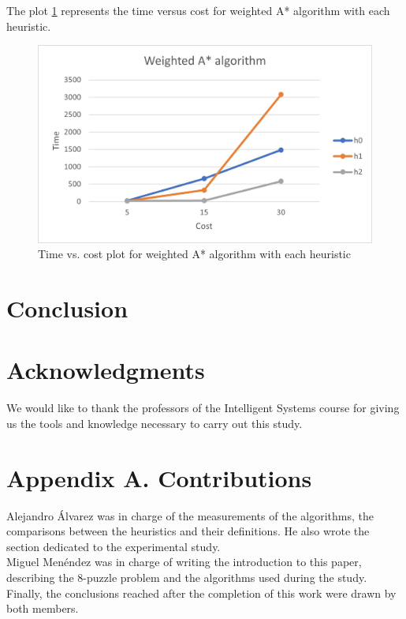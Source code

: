 \documentclass[runningheads]{llncs}
\begin{document}
The plot \ref{fig:wastar} represents the time versus cost for weighted A* algorithm with each heuristic.
\begin{figure}[H]
    \centering
    \includegraphics{WeightedAStarTimes.jpg}
    \caption{Time vs. cost plot for weighted A* algorithm with each heuristic}
    \label{fig:wastar}
\end{figure}

\section{Conclusion}

\section*{Acknowledgments}
We would like to thank the professors of the Intelligent Systems course for giving us the tools and knowledge necessary to carry out this study.
\section*{Appendix A. Contributions}
Alejandro Álvarez was in charge of the measurements of the algorithms, the comparisons between the heuristics and their definitions. He also wrote the section dedicated to the experimental study.
\\
Miguel Menéndez was in charge of writing the introduction to this paper, describing the 8-puzzle problem and the algorithms used during the study.
\\
Finally, the conclusions reached after the completion of this work were drawn by both members.
\end{document}
